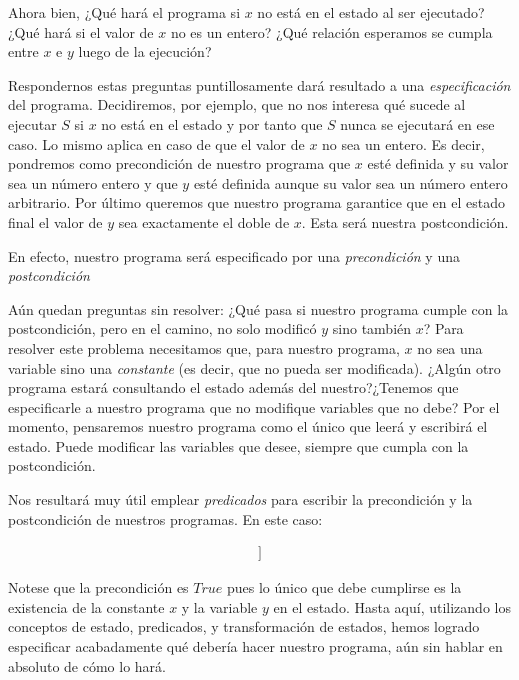 \documentclass[12pt, a4paper, openany, fleqn]{book}
\begin{document}
    Ahora bien,
    ¿Qué hará el programa si $x$ no está en el estado al ser ejecutado?
    ¿Qué hará si el valor de $x$ no es un entero?
    ¿Qué relación esperamos se cumpla entre $x$ e $y$ luego de la ejecución?

    Respondernos estas preguntas puntillosamente dará resultado a una \textit{especificación} del programa.
    Decidiremos, por ejemplo, que no nos interesa qué sucede al ejecutar $S$ si $x$ no está en el estado y por tanto que $S$ nunca se ejecutará en ese caso. Lo mismo aplica en caso de que el valor de $x$ no sea un entero. Es decir, pondremos como precondición de nuestro programa que $x$ esté definida y su valor sea un número entero y que $y$ esté definida aunque su valor sea un número entero arbitrario. Por último queremos que nuestro programa garantice que en el estado final el valor de $y$ sea exactamente el doble de $x$. Esta será nuestra postcondición.

    En efecto, nuestro programa será especificado por una \textit{precondición} y una \textit{postcondición}

    Aún quedan preguntas sin resolver:
    ¿Qué pasa si nuestro programa cumple con la postcondición, pero en el camino, no solo modificó $y$ sino también $x$? Para resolver este problema necesitamos que, para nuestro programa, $x$ no sea una variable sino una \textit{constante} (es decir, que no pueda ser modificada).
    ¿Algún otro programa estará consultando el estado además del nuestro?¿Tenemos que especificarle a nuestro programa que no modifique variables que no debe? Por el momento, pensaremos nuestro programa como el único que leerá y escribirá el estado. Puede modificar las variables que desee, siempre que cumpla con la postcondición.

    Nos resultará muy útil emplear \textit{predicados} para escribir la precondición y la postcondición de nuestros programas. En este caso:

    \begin{align*}
        [[& \text{const x} \in \mathbb{Z} \\
          & \text{var y} \in \mathbb{Z} \\
          & \lbrace {True} \rbrace \\
          & S \\
          & \lbrace {y = x * 2} \rbrace \\
        ]]
    \end{align*}

    Notese que la precondición es $True$ pues lo único que debe cumplirse es la existencia de la constante $x$ y la variable $y$ en el estado.
    Hasta aquí, utilizando los conceptos de estado, predicados, y transformación de estados, hemos logrado especificar acabadamente qué debería hacer nuestro programa, aún sin hablar en absoluto de cómo lo hará.
\end{document}
